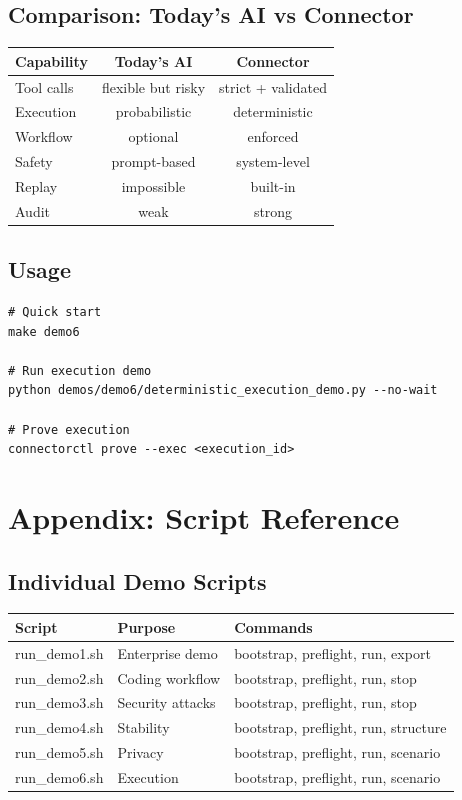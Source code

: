 \documentclass[11pt,a4paper]{article}
\begin{document}
\subsection{Comparison: Today's AI vs Connector}

\begin{tabular}{lcc}
\toprule
\textbf{Capability} & \textbf{Today's AI} & \textbf{Connector} \\
\midrule
Tool calls & flexible but risky & strict + validated \\
Execution & probabilistic & deterministic \\
Workflow & optional & enforced \\
Safety & prompt-based & system-level \\
Replay & impossible & built-in \\
Audit & weak & strong \\
\bottomrule
\end{tabular}

\subsection{Usage}

\begin{lstlisting}
# Quick start
make demo6

# Run execution demo
python demos/demo6/deterministic_execution_demo.py --no-wait

# Prove execution
connectorctl prove --exec <execution_id>
\end{lstlisting}

\newpage

\section*{Appendix: Script Reference}

\subsection{Individual Demo Scripts}

\begin{tabular}{lll}
\toprule
\textbf{Script} & \textbf{Purpose} & \textbf{Commands} \\
\midrule
run\_demo1.sh & Enterprise demo & bootstrap, preflight, run, export \\
run\_demo2.sh & Coding workflow & bootstrap, preflight, run, stop \\
run\_demo3.sh & Security attacks & bootstrap, preflight, run, stop \\
run\_demo4.sh & Stability & bootstrap, preflight, run, structure \\
run\_demo5.sh & Privacy & bootstrap, preflight, run, scenario \\
run\_demo6.sh & Execution & bootstrap, preflight, run, scenario \\
\bottomrule
\end{tabular}
\end{document}

